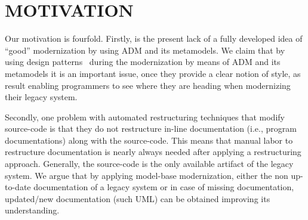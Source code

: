 \documentclass[a4paper,twoside]{article}
\begin{document}
\section{\uppercase{Motivation}}

\noindent Our motivation is fourfold. Firstly, is the present lack of a fully developed idea of ``good'' modernization by using ADM and its metamodels. We claim that by using design patterns~\cite{Gamma1994} during the modernization by means of ADM and its metamodels it is an important issue, once they provide a clear notion of style, as result enabling programmers to see where they are heading when modernizing their legacy system. 








Secondly, one problem with automated restructuring techniques that modify source-code is that they do not restructure in-line documentation (i.e., program documentations) along with the source-code. This means that manual labor to restructure documentation is nearly always needed after applying a restructuring approach. Generally, the source-code is the only available artifact of the legacy system. We argue that by applying model-base modernization, either the non up-to-date documentation of a legacy system or in case of missing documentation, updated/new documentation (such UML) can be obtained improving its understanding.
\end{document}
